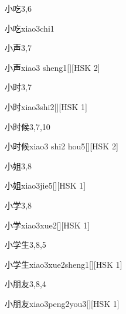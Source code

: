 \begin{entry}{小吃}{3,6}
  \begin{phonetics}{小吃}{xiao3chi1}
  \end{phonetics}
\end{entry}

\begin{entry}{小声}{3,7}
  \begin{phonetics}{小声}{xiao3 sheng1}[][HSK 2]
  \end{phonetics}
\end{entry}

\begin{entry}{小时}{3,7}
  \begin{phonetics}{小时}{xiao3shi2}[][HSK 1]
  \end{phonetics}
\end{entry}

\begin{entry}{小时候}{3,7,10}
  \begin{phonetics}{小时候}{xiao3 shi2 hou5}[][HSK 2]
  \end{phonetics}
\end{entry}

\begin{entry}{小姐}{3,8}
  \begin{phonetics}{小姐}{xiao3jie5}[][HSK 1]
  \end{phonetics}
\end{entry}

\begin{entry}{小学}{3,8}
  \begin{phonetics}{小学}{xiao3xue2}[][HSK 1]
  \end{phonetics}
\end{entry}

\begin{entry}{小学生}{3,8,5}
  \begin{phonetics}{小学生}{xiao3xue2sheng1}[][HSK 1]
  \end{phonetics}
\end{entry}

\begin{entry}{小朋友}{3,8,4}
  \begin{phonetics}{小朋友}{xiao3peng2you3}[][HSK 1]
  \end{phonetics}
\end{entry}

